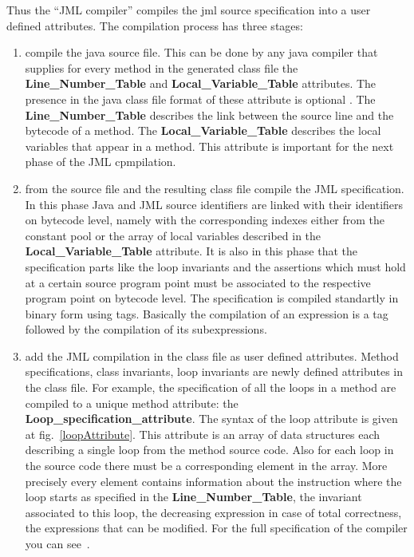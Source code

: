 Thus the ``JML compiler'' compiles the jml source specification into a user defined attributes. The compilation process has three stages:
\begin{enumerate}
\item compile the java source file. This can be done by any java compiler that supplies for every method in the generated class file the \textbf{Line\_Number\_Table} and \textbf{Local\_Variable\_Table}  attributes.
 The presence in the java class file format of these attribute is optional \cite{VMSpec}. The \textbf{Line\_Number\_Table} describes the link between the source line and the bytecode of a method.  The \textbf{Local\_Variable\_Table} describes the local variables that appear in a method. This attribute is important for the next phase of the JML cpmpilation.
\item from the source file and the resulting class file compile the JML specification. In this phase Java and JML source identifiers are linked with their identifiers on bytecode level, namely with the corresponding indexes either from the constant pool or the array of local variables described in the \textbf{Local\_Variable\_Table} attribute. It is also in this phase that the specification parts like the loop invariants and the assertions which must hold at a certain source program point must be associated to the respective program point on bytecode level. The specification
is compiled standartly in binary form using tags. Basically the compilation of an expression is a tag followed by the compilation of its subexpressions. 


\item add the JML compilation in the class file as user defined attributes. Method specifications, class invariants, loop invariants are 
newly defined attributes in the class file.
 For example, the specification of all the loops in a method are compiled to a unique method attribute: the \textbf{Loop\_specification\_attribute}. The syntax of the loop attribute is given at fig.~\ref{loopAttribute}. This attribute is an array of data structures each describing a single loop from the method source code. Also for each loop in the source code there must be a corresponding element in the array. 
More precisely every element contains information about the instruction where the loop starts as specified in the \textbf{Line\_Number\_Table}, the invariant associated to this loop, the decreasing expression in case of total correctness, the expressions that can be modified. 
For the full specification of the compiler you can see~\cite{JML2BCSpec}.
\end{enumerate}

